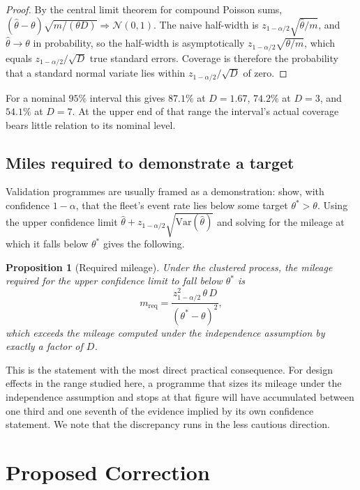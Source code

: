 \documentclass[11pt]{article}
\newtheorem{proposition}{Proposition}
\begin{document}
\begin{proof}
By the central limit theorem for compound Poisson sums,
$(\hat{\theta} - \theta)\sqrt{m/(\theta D)} \Rightarrow \mathcal{N}(0,1)$. The
naive half-width is $z_{1-\alpha/2}\sqrt{\hat\theta/m}$, and
$\hat\theta \to \theta$ in probability, so the half-width is asymptotically
$z_{1-\alpha/2}\sqrt{\theta/m}$, which equals $z_{1-\alpha/2}/\sqrt{D}$ true
standard errors. Coverage is therefore the probability that a standard normal
variate lies within $z_{1-\alpha/2}/\sqrt{D}$ of zero.
\end{proof}

For a nominal $95\%$ interval this gives $87.1\%$ at $D = 1.67$, $74.2\%$ at
$D = 3$, and $54.1\%$ at $D = 7$. At the upper end of that range the interval's
actual coverage bears little relation to its nominal level.

\subsection{Miles required to demonstrate a target}

Validation programmes are usually framed as a demonstration: show, with
confidence $1 - \alpha$, that the fleet's event rate lies below some target
$\theta^{*} > \theta$. Using the upper confidence limit
$\hat\theta + z_{1-\alpha/2}\sqrt{\mathrm{Var}(\hat\theta)}$ and
solving for the mileage at which it falls below $\theta^{*}$ gives the following.

\begin{proposition}[Required mileage]
\label{prop:miles}
Under the clustered process, the mileage required for the upper confidence limit
to fall below $\theta^{*}$ is
\begin{equation}
m_{\text{req}} = \frac{z_{1-\alpha/2}^{2} \, \theta \, D}{(\theta^{*} - \theta)^{2}},
\end{equation}
which exceeds the mileage computed under the independence assumption by exactly a
factor of $D$.
\end{proposition}

This is the statement with the most direct practical consequence. For design
effects in the range studied here, a programme that sizes its mileage under the
independence assumption and stops at that figure will have accumulated between one
third and one seventh of the evidence implied by its own confidence statement. We
note that the discrepancy runs in the less cautious direction.

\section{Proposed Correction}
\label{sec:correction}
\end{document}
